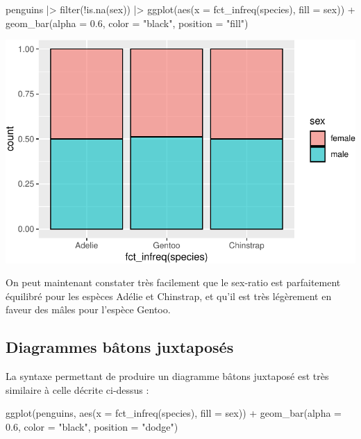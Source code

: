 \documentclass[
  a4paper,
  DIV=11,
  numbers=noendperiod,
  oneside]{scrreprt}
\newenvironment{Shaded}{}{}
\newcommand{\AttributeTok}[1]{\textcolor[rgb]{0.84,0.23,0.29}{#1}}
\newcommand{\FloatTok}[1]{\textcolor[rgb]{0.00,0.36,0.77}{#1}}
\newcommand{\FunctionTok}[1]{\textcolor[rgb]{0.44,0.26,0.76}{#1}}
\newcommand{\NormalTok}[1]{\textcolor[rgb]{0.14,0.16,0.18}{#1}}
\newcommand{\SpecialCharTok}[1]{\textcolor[rgb]{0.00,0.36,0.77}{#1}}
\newcommand{\StringTok}[1]{\textcolor[rgb]{0.01,0.18,0.38}{#1}}
\begin{document}
\begin{Shaded}
\begin{Highlighting}[]
\NormalTok{penguins }\SpecialCharTok{|\textgreater{}} 
  \FunctionTok{filter}\NormalTok{(}\SpecialCharTok{!}\FunctionTok{is.na}\NormalTok{(sex)) }\SpecialCharTok{|\textgreater{}} 
  \FunctionTok{ggplot}\NormalTok{(}\FunctionTok{aes}\NormalTok{(}\AttributeTok{x =} \FunctionTok{fct\_infreq}\NormalTok{(species), }\AttributeTok{fill =}\NormalTok{ sex)) }\SpecialCharTok{+}
  \FunctionTok{geom\_bar}\NormalTok{(}\AttributeTok{alpha =} \FloatTok{0.6}\NormalTok{, }\AttributeTok{color =} \StringTok{"black"}\NormalTok{, }\AttributeTok{position =} \StringTok{"fill"}\NormalTok{)}
\end{Highlighting}
\end{Shaded}

\includegraphics{03-visualization_files/figure-pdf/unnamed-chunk-57-1.pdf}

On peut maintenant constater très facilement que le sex-ratio est
parfaitement équilibré pour les espèces Adélie et Chinstrap, et qu'il
est très légèrement en faveur des mâles pour l'espèce Gentoo.

\subsection{Diagrammes bâtons juxtaposés}\label{sec-juxta}

La syntaxe permettant de produire un diagramme bâtons juxtaposé est très
similaire à celle décrite ci-dessus :

\begin{Shaded}
\begin{Highlighting}[]
\FunctionTok{ggplot}\NormalTok{(penguins, }\FunctionTok{aes}\NormalTok{(}\AttributeTok{x =} \FunctionTok{fct\_infreq}\NormalTok{(species), }\AttributeTok{fill =}\NormalTok{ sex)) }\SpecialCharTok{+}
  \FunctionTok{geom\_bar}\NormalTok{(}\AttributeTok{alpha =} \FloatTok{0.6}\NormalTok{, }\AttributeTok{color =} \StringTok{"black"}\NormalTok{, }\AttributeTok{position =} \StringTok{"dodge"}\NormalTok{)}
\end{Highlighting}
\end{Shaded}
\end{document}

